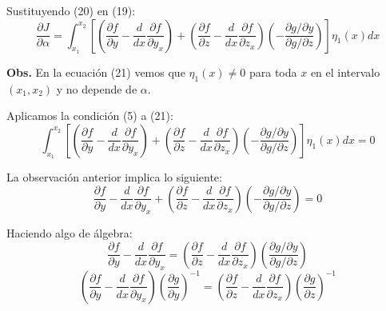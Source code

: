 Sustituyendo (20) en (19):
\begin{equation}
    \frac{\partial J}{\partial \alpha} =
    \int_{x_{1}}^{x_{2}} \left[ \left( \frac{\partial f}{\partial y} - \frac{d}{dx} \frac{\partial f}{\partial y_{x}} \right)
    + \left( \frac{\partial f}{\partial z} - \frac{d}{dx} \frac{\partial f}{\partial z_{x}} \right) \left( - \frac{\partial g/\partial y}{\partial g/\partial z} \right) \right] \eta_{1}(x)dx
\end{equation}

\vspace*{0.5cm}
\textbf{Obs.} En la ecuación (21) vemos que $\eta_{1}(x) \neq 0$ para toda $x$ en el intervalo $(x_{1},x_{2})$ y no
depende de $\alpha$.

\vspace*{0.5cm}
Aplicamos la condición (5) a (21):
\begin{equation}
    \int_{x_{1}}^{x_{2}} \left[ \left( \frac{\partial f}{\partial y} - \frac{d}{dx} \frac{\partial f}{\partial y_{x}} \right)
    + \left( \frac{\partial f}{\partial z} - \frac{d}{dx} \frac{\partial f}{\partial z_{x}} \right) \left( - \frac{\partial g/\partial y}{\partial g/\partial z} \right) \right] \eta_{1}(x)dx = 0
\end{equation}

La observación anterior implica lo siguiente:
\begin{equation*}
    \frac{\partial f}{\partial y} - \frac{d}{dx} \frac{\partial f}{\partial y_{x}}
    + \left( \frac{\partial f}{\partial z} - \frac{d}{dx} \frac{\partial f}{\partial z_{x}} \right) \left( - \frac{\partial g/\partial y}{\partial g/\partial z} \right) = 0
\end{equation*}

Haciendo algo de álgebra:
\begin{equation*}
    \frac{\partial f}{\partial y} - \frac{d}{dx} \frac{\partial f}{\partial y_{x}} =
    \left( \frac{\partial f}{\partial z} - \frac{d}{dx} \frac{\partial f}{\partial z_{x}} \right) \left( \frac{\partial g/\partial y}{\partial g/\partial z} \right)
\end{equation*}
\begin{equation}
    \left( \frac{\partial f}{\partial y} - \frac{d}{dx} \frac{\partial f}{\partial y_{x}} \right) \left( \frac{\partial g}{\partial y} \right)^{-1} =
    \left( \frac{\partial f}{\partial z} - \frac{d}{dx} \frac{\partial f}{\partial z_{x}} \right) \left( \frac{\partial g}{\partial z} \right)^{-1}
\end{equation}

